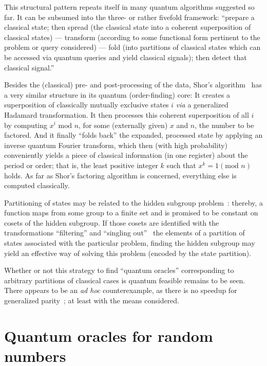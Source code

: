 \documentclass[runningheads]{llncs}
\begin{document}
This structural pattern repeats itself in many quantum algorithms suggested so far.
It can be subsumed into the three- or rather fivefold framework:
``prepare a classical state; then
spread (the classical state into a coherent superposition of classical states)
---
transform (according to some functional form pertinent to the problem or query considered)
---
fold (into partitions of classical states which can be accessed via quantum queries and yield classical signals);
then detect that classical signal.''

Besides the (classical) pre- and post-processing of the data,
Shor's algorithm~\cite[Chapter~5]{nielsen-book10}
has a very similar structure in its quantum (order-finding) core:
It creates a superposition of classically mutually exclusive states $i$
{\it via} a generalized Hadamard transformation.
It then processes this coherent superposition of all $i$ by computing $x^i \text{ mod } n$,
for some (externally given) $x$ and $n$, the number to be factored.
And it finally ``folds back'' the expanded, processed state by applying an inverse quantum Fourier transform,
which then (with high probability) conveniently yields a piece of classical information (in one register) about the period or order; that is,
the least positive integer $k$ such that $x^k =1 (\text{mod } n)$ holds.
As far as Shor's factoring algorithm is concerned, everything else is computed classically.

Partitioning of states may be related to the hidden subgroup problem~\cite[Section~5.4.3]{nielsen-book10}:
thereby, a function maps from some group to a finite set and is
promised to be constant on cosets of the hidden subgroup.
If those cosets are identified with the transformations ``filtering'' and ``singling out''~\cite{DonSvo01,svozil-2002-statepart-prl,svozil-2003-garda,svozil-2005-ko}
the elements of a partition of states associated with the particular problem,
finding the hidden subgroup may yield an effective way of solving this problem (encoded by the state partition).

Whether or not this strategy to find ``quantum oracles'' corresponding to arbitrary partitions
of classical cases is quantum feasible remains to be seen. There appears to be an {\it ad hoc} counterexample,
as there is no speedup for generalized parity~\cite{Farhi-98}; at least with the means considered.

\section{Quantum oracles for random numbers}
\end{document}
